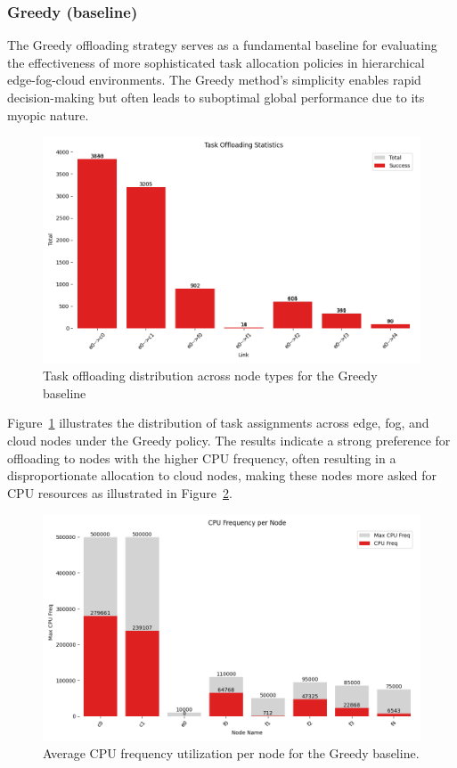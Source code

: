 \documentclass[preprint,3p,authoryear]{elsarticle}
\begin{document}
\subsubsection{Greedy (baseline)}
\label{subsec:greedy-baseline}

The Greedy offloading strategy serves as a fundamental baseline for evaluating the effectiveness of more sophisticated task allocation policies in hierarchical edge-fog-cloud environments. The Greedy method's simplicity enables rapid decision-making but often leads to suboptimal global performance due to its myopic nature. 


\begin{figure}[H]
    \centering
    \includegraphics[width=0.5\linewidth]{figs/Greedy/task_offloading_statistics.png}
    \caption{Task offloading distribution across node types for the Greedy baseline}
    \label{fig:greedy-task-offloading-stats}
\end{figure}

Figure~\ref{fig:greedy-task-offloading-stats} illustrates the distribution of task assignments across edge, fog, and cloud nodes under the Greedy policy. The results indicate a strong preference for offloading to nodes with the higher CPU frequency, often resulting in a disproportionate allocation to cloud nodes, making these nodes more asked for CPU resources as illustrated in Figure~\ref{fig:greedy-cpu-freq}.



\begin{figure}[H]
    \centering
    \includegraphics[width=0.5\linewidth]{figs/Greedy/cpu_frequency_per_node.png}
    \caption{Average CPU frequency utilization per node for the Greedy baseline.}
    \label{fig:greedy-cpu-freq}
\end{figure}
\end{document}
